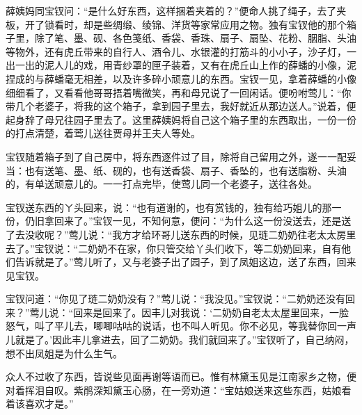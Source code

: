 \begin{parag}
    薛姨妈同宝钗问：“是什么好东西，这样捆着夹着的？”便命人挑了绳子，去了夹板，开了锁看时，却是些绸缎、绫锦、洋货等家常应用之物。独有宝钗他的那个箱子里，除了笔、墨、砚、各色笺纸、香袋、香珠、扇子、扇坠、花粉、胭脂、头油等物外，还有虎丘带来的自行人、酒令儿、水银灌的打筋斗的小小子，沙子灯，一出一出的泥人儿的戏，用青纱罩的匣子装着，又有在虎丘山上作的薛蟠的小像，泥捏成的与薛蟠毫无相差，以及许多碎小顽意儿的东西。宝钗一见，拿着薛蟠的小像细细看了，又看看他哥哥捂着嘴微笑，再和母兄说了一回闲话。便吩咐莺儿：“你带几个老婆子，将我的这个箱子，拿到园子里去，我好就近从那边送人。”说着，便起身辞了母兄往园子里去了。这里薛姨妈将自己这个箱子里的东西取出，一份一份的打点清楚，着莺儿送往贾母并王夫人等处。
\end{parag}


\begin{parag}
    宝钗随着箱子到了自己房中，将东西逐件过了目，除将自己留用之外，遂一一配妥当：也有送笔、墨、纸、砚的，也有送香袋、扇子、香坠的，也有送脂粉、头油的，有单送顽意儿的。一一打点完毕，使莺儿同一个老婆子，送往各处。
\end{parag}


\begin{parag}
    宝钗送东西的ㄚ头回来，说：“也有道谢的，也有赏钱的，独有给巧姐儿的那一份，仍旧拿回来了。”宝钗一见，不知何意，便问：“为什么这一份没送去，还是送了去没收呢？”莺儿说：“我方才给环哥儿送东西的时候，见琏二奶奶往老太太房里去了。”宝钗说：“二奶奶不在家，你只管交给丫头们收下，等二奶奶回来，自有他们告诉就是了。”莺儿听了，又与老婆子出了园子，到了凤姐这边，送了东西，回来见宝钗。
\end{parag}


\begin{parag}
    宝钗问道：“你见了琏二奶奶没有？”莺儿说：“我没见。”宝钗说：“二奶奶还没有回来？”莺儿说：“回来是回来了。因丰儿对我说：‘二奶奶自老太太屋里回来，一脸怒气，叫了平儿去，唧唧咕咕的说话，也不叫人听见。你不必见，等我替你回一声儿就是了。’因此丰儿拿进去，回了二奶奶。我们就回来了。”宝钗听了，自己纳闷，想不出凤姐是为什么生气。
\end{parag}


\begin{parag}
    众人不过收了东西，皆说些见面再谢等语而已。惟有林黛玉见是江南家乡之物，便对着挥泪自叹。紫鹃深知黛玉心肠，在一旁劝道：“宝姑娘送来这些东西，姑娘看着该喜欢才是。”
\end{parag}


